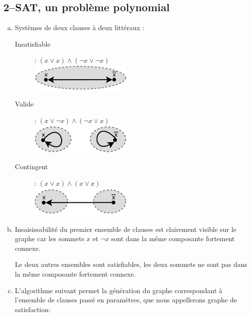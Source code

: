 \subsection{2--SAT, un problème polynomial}
\begin{enumerate}[(a)]
\item Systèmes de deux clauses à deux littéraux :
\begin{description}
\item[Insatisfiable] : $(x \vee x) \wedge (\neg x \vee \neg x)$ \\
\includegraphics[width=5cm]{files/g1ex3.pdf}
\item[Valide] : $(x \vee \neg x) \wedge (\neg x \vee x)$ \\
\includegraphics[width=5cm]{files/g2ex3.pdf}
\item[Contingent] : $(x \vee x) \wedge (x \vee x)$ \\
\includegraphics[width=5cm]{files/g3ex3.pdf}
\end{description}
\item 

Insaisissabilité du premier ensemble de clauses est clairement visible sur le graphe car les sommets $x$ et $\neg x$ sont dans la même composante fortement connexe.

Le deux autres ensembles sont satisfiables, les deux sommets ne sont pas dans la même composante fortement connexe.

\item L'algorithme suivant permet la génération du graphe correspondant à l'ensemble de clauses passé en paramètres, que nous appellerons graphe de satisfaction:


\end{enumerate}
